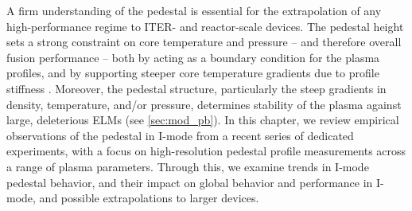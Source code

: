 \begin{figure}[t]
 \pushtooutside
\end{figure}

A firm understanding of the pedestal is essential for the extrapolation of any high-performance regime to ITER- and reactor-scale devices.  The pedestal height sets a strong constraint on core temperature and pressure -- and therefore overall fusion performance -- both by acting as a boundary condition for the plasma profiles, and by supporting steeper core temperature gradients due to profile stiffness \cite{Kinsey2011,Hubbard1998}.  Moreover, the pedestal structure, particularly the steep gradients in density, temperature, and/or pressure, determines stability of the plasma against large, deleterious ELMs (see \cref{sec:mod_pb}).  In this chapter, we review empirical observations of the pedestal in I-mode from a recent series of dedicated experiments, with a focus on high-resolution pedestal profile measurements across a range of plasma parameters.  Through this, we examine trends in I-mode pedestal behavior, and their impact on global behavior and performance in I-mode, and possible extrapolations to larger devices.\nicesectionending

